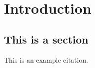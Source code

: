 \chapter{Introduction}
\label{cha:Intro}

\section{This is a section}
\label{sec:section1}
This is an example citation\cite{carmignani_visualization_2002}.